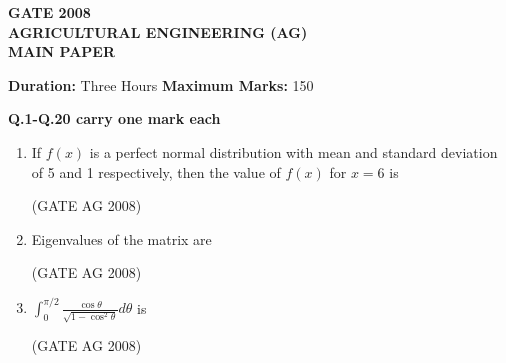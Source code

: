 \documentclass[journal,12pt,onecolumn]{IEEEtran}
\begin{document}
\begin{center}
    \textbf{\Large GATE 2008\\
    AGRICULTURAL ENGINEERING (AG)\\
    MAIN PAPER}
\end{center}

\bigskip


\textbf{Duration:} Three Hours \hfill \textbf{Maximum Marks:} 150

\textbf{Q.1-Q.20 carry one mark each}

\medskip
\begin{enumerate}
\item 
 If $f(x)$ is a perfect normal distribution with mean and standard deviation of 5 and 1 respectively, then the value of $f(x)$ for $x = 6$ is
\begin{enumerate}
\end{enumerate}
\hfill(GATE AG 2008)\\

\medskip

\item 
 Eigenvalues of the matrix
  are 
\begin{enumerate}
\end{enumerate}
\hfill(GATE AG 2008)\\

\medskip

\item  
 $\displaystyle \int_0^{\pi/2} \frac{\cos \theta }{\sqrt{1 - \cos^2 \theta} } d\theta $ is 
\begin{enumerate}
\end{enumerate}
\hfill(GATE AG 2008)\\


\end{enumerate}
\end{document}
